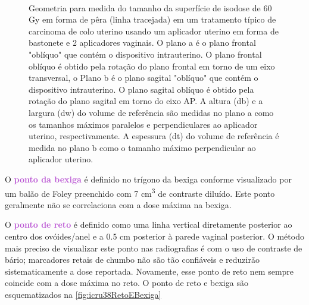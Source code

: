 \documentclass[11pt,a4paper]{article}
\begin{document}
	\begin{figure}[h]
		\centering
		 \\ %
		\caption{Geometria para medida do tamanho da superfície de isodose de 60 Gy em forma de pêra (linha tracejada) em um tratamento típico de carcinoma de colo uterino usando um aplicador uterino em forma de bastonete e 2 aplicadores vaginais. O plano a é o plano frontal "oblíquo" que contém o dispositivo intrauterino. O plano frontal oblíquo é obtido pela rotação do plano frontal em torno de um eixo transversal, o Plano b é o plano sagital "oblíquo" que contém o dispositivo intrauterino. O plano sagital oblíquo é obtido pela rotação do plano sagital em torno do eixo AP. A altura (db) e a largura (dw) do volume de referência são medidas no plano a como os tamanhos máximos paralelos e perpendiculares ao aplicador uterino, respectivamente. A espessura (dt) do volume de referência é medida no plano b como o tamanho máximo perpendicular ao aplicador uterino.}
		\label{fig:icru38Presc}
	\end{figure}

	O \textcolor{MediumOrchid}{\textbf{ponto da bexiga}} é definido no trígono da bexiga conforme visualizado por um balão de Foley preenchido com 7 \unit{cm^3}  de contraste diluído. Este ponto geralmente não se correlaciona com a dose máxima na bexiga.
	
	O \textcolor{MediumOrchid}{\textbf{ponto de reto}} é definido como uma linha vertical diretamente posterior ao centro dos ovóides/anel e a 0.5 cm posterior à parede vaginal posterior. O método mais preciso de visualizar este ponto nas radiografias é com o uso de contraste de bário; marcadores retais de chumbo não são tão confiáveis e reduzirão sistematicamente a dose reportada. Novamente, esse ponto de reto nem sempre coincide com a dose máxima no reto. O ponto de reto e bexiga são esquematizados na \ref{fig:icru38RetoEBexiga}
\end{document}
